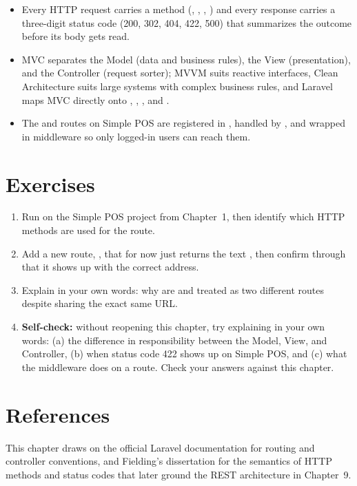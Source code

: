 \begin{itemize}
  \item Every HTTP request carries a method (, ,
    , ) and every response carries a three-digit
    status code (200, 302, 404, 422, 500) that summarizes the outcome
    before its body gets read.
  \item MVC separates the Model (data and business rules), the View
    (presentation), and the Controller (request sorter); MVVM suits
    reactive interfaces, Clean Architecture suits large systems with
    complex business rules, and Laravel maps MVC directly onto
    , , , and
    .
  \item The  and  routes on Simple POS
    are registered in , handled by
    , and wrapped in  middleware
    so only logged-in users can reach them.
\end{itemize}

\section{Exercises}

\begin{enumerate}
  \item Run  on the Simple POS project from Chapter~1,
    then identify which HTTP methods are used for the  route.
  \item Add a new route, , that for now just
    returns the text , then confirm through
     that it shows up with the correct address.
  \item Explain in your own words: why are  and
     treated as two different routes despite sharing the
    exact same URL.
  \item \textbf{Self-check:} without reopening this chapter, try explaining
    in your own words: (a) the difference in responsibility between the
    Model, View, and Controller, (b) when status code 422 shows up on
    Simple POS, and (c) what the  middleware does on a route.
    Check your answers against this chapter.
\end{enumerate}

\section{References}

This chapter draws on the official Laravel documentation
\cite{laraveldocs} for routing and controller conventions, and Fielding's
dissertation \cite{fielding2000rest} for the semantics of HTTP methods and
status codes that later ground the REST architecture in Chapter~9.
